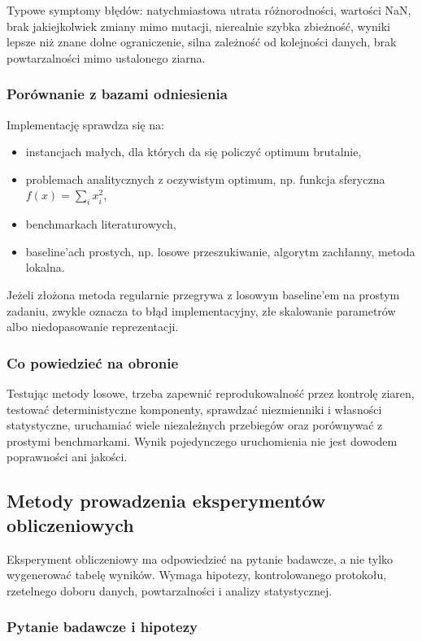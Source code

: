 Typowe symptomy błędów: natychmiastowa utrata różnorodności, wartości NaN, brak jakiejkolwiek zmiany mimo mutacji, nierealnie szybka zbieżność, wyniki lepsze niż znane dolne ograniczenie, silna zależność od kolejności danych, brak powtarzalności mimo ustalonego ziarna.

\subsubsection{Porównanie z bazami odniesienia}

Implementację sprawdza się na:
\begin{itemize}
  \item instancjach małych, dla których da się policzyć optimum brutalnie,
  \item problemach analitycznych z oczywistym optimum, np. funkcja sferyczna $f(x)=\sum_i x_i^2$,
  \item benchmarkach literaturowych,
  \item baseline'ach prostych, np. losowe przeszukiwanie, algorytm zachłanny, metoda lokalna.
\end{itemize}

Jeżeli złożona metoda regularnie przegrywa z losowym baseline'em na prostym zadaniu, zwykle oznacza to błąd implementacyjny, złe skalowanie parametrów albo niedopasowanie reprezentacji.

\subsubsection{Co powiedzieć na obronie}

Testując metody losowe, trzeba zapewnić reprodukowalność przez kontrolę ziaren, testować deterministyczne komponenty, sprawdzać niezmienniki i własności statystyczne, uruchamiać wiele niezależnych przebiegów oraz porównywać z prostymi benchmarkami. Wynik pojedynczego uruchomienia nie jest dowodem poprawności ani jakości.

\subsection{Metody prowadzenia eksperymentów obliczeniowych}

Eksperyment obliczeniowy ma odpowiedzieć na pytanie badawcze, a nie tylko wygenerować tabelę wyników. Wymaga hipotezy, kontrolowanego protokołu, rzetelnego doboru danych, powtarzalności i analizy statystycznej.

\subsubsection{Pytanie badawcze i hipotezy}

